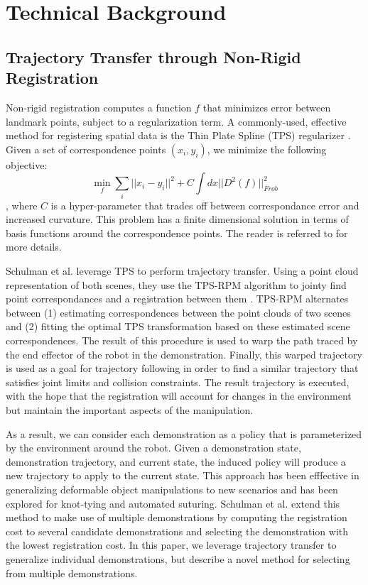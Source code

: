 \section{Technical Background}

\subsection{Trajectory Transfer through Non-Rigid Registration}
Non-rigid registration computes a function $f$ that minimizes error between landmark points, subject to a regularization term.
A commonly-used, effective method for registering spatial data is the Thin Plate Spline (TPS) regularizer .
Given a set of correspondence points $(x_i, y_i)$, we minimize the following objective:
$$\min_f \sum_i ||x_i - y_i||^2 + C\int dx ||D^2(f)||^2_{Frob}$$,
where $C$ is a hyper-parameter that trades off between correspondance error and increased curvature.
This problem has a finite dimensional solution in terms of basis functions around the correspondence points.
The reader is referred to  for more details.

Schulman et al. leverage TPS to perform trajectory transfer. 
Using a point cloud representation of both scenes, they use the TPS-RPM algorithm to jointy find point correspondances and a registration between them .
TPS-RPM alternates between (1) estimating correspondences between the point clouds of two scenes and (2) fitting the optimal TPS transformation based on these estimated scene correspondences. 
The result of this procedure is used to warp the path traced by the end effector of the robot in the demonstration.
Finally, this warped trajectory is used as a goal for trajectory following in order to find a similar trajectory that satisfies joint limits and collision constraints.
The result trajectory is executed, with the hope that the registration will account for changes in the environment but maintain the important aspects of the manipulation.

As a result, we can consider each demonstration as a policy that is parameterized by the environment around the robot.
Given a demonstration state, demonstration trajectory, and current state, the induced policy will produce a new trajectory to apply to the current state.
This approach has been efffective in generalizing deformable object manipulations to new scenarios and has been explored for knot-tying and automated suturing.
Schulman et al. extend this method to make use of multiple demonstrations by computing the registration cost to several candidate demonstrations and selecting the demonstration with the lowest registration cost.
In this paper, we leverage trajectory transfer to generalize individual demonstrations, but describe a novel method for selecting from multiple demonstrations.
